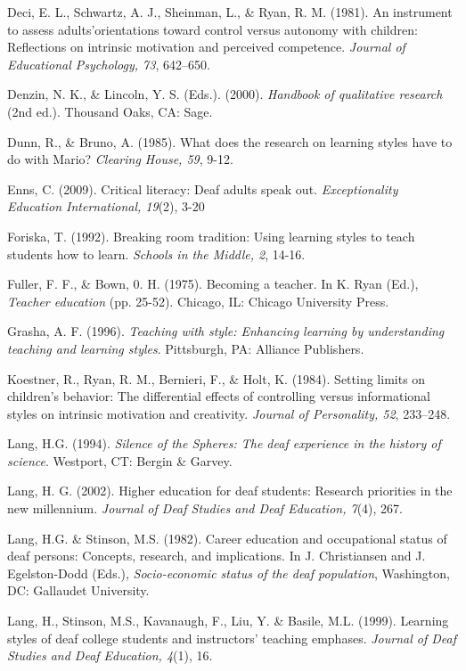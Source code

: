 \documentclass[11.5pt]{sig-alternate} %
\begin{document}
Deci, E. L., Schwartz, A. J., Sheinman, L., \& Ryan, R. M. (1981). An instrument to assess adults’orientations toward control versus autonomy with children: Reflections on intrinsic motivation and perceived competence. \textit{Journal of Educational Psychology, 73}, 642–650.

Denzin, N. K., \& Lincoln, Y. S. (Eds.). (2000). \textit{Handbook of qualitative research} (2nd ed.). Thousand Oaks, CA: Sage.

Dunn, R., \& Bruno, A. (1985). What does the research on learning styles have to do with Mario? \textit{Clearing House, 59}, 9-12.

Enns, C. (2009). Critical literacy: Deaf adults speak out. \textit{Exceptionality Education International, 19}(2), 3-20

Foriska, T. (1992). Breaking room tradition: Using learning styles to teach students how to learn. \textit{Schools in the Middle, 2}, 14-16.

Fuller, F. F., \& Bown, 0. H. (1975). Becoming a teacher. In K. Ryan (Ed.), \textit{Teacher education} (pp. 25-52). Chicago, IL: Chicago University Press.

Grasha, A. F. (1996). \textit{Teaching with style: Enhancing learning by understanding teaching and learning styles}. Pittsburgh, PA: Alliance Publishers.

Koestner, R., Ryan, R. M., Bernieri, F., \& Holt, K. (1984). Setting limits on children’s behavior: The differential effects of controlling versus informational styles on intrinsic motivation and creativity. \textit{Journal of Personality, 52}, 233–248.

Lang, H.G. (1994). \textit{Silence of the Spheres: The deaf experience in the history of science}. Westport, CT: Bergin \& Garvey.

Lang, H. G. (2002). Higher education for deaf students: Research priorities in the new millennium. \textit{Journal of Deaf Studies and Deaf Education, 7}(4), 267. 

Lang, H.G. \& Stinson, M.S. (1982). Career education and occupational status of deaf persons: Concepts, research, and implications. In J. Christiansen and J. Egelston-Dodd (Eds.), \textit{Socio-economic status of the deaf population}, Washington, DC: Gallaudet University. 

Lang, H., Stinson, M.S., Kavanaugh, F., Liu, Y. \& Basile, M.L. (1999). Learning styles of deaf college students and instructors' teaching emphases. \textit{Journal of Deaf Studies and Deaf Education, 4}(1), 16. 
\end{document}
